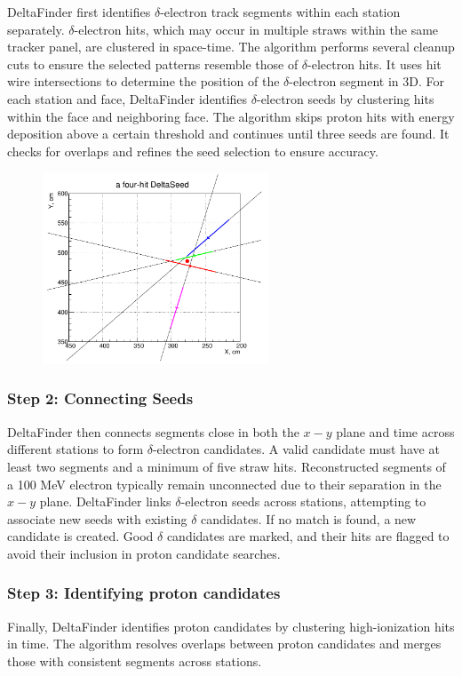 DeltaFinder first identifies $\delta$-electron track segments within 
each station separately. $\delta$-electron hits, which may occur in multiple 
straws within the same tracker panel, are clustered in space-time. The algorithm 
performs several cleanup cuts to ensure the selected patterns resemble 
those of $\delta$-electron hits. It uses hit wire intersections to determine the position 
of the $\delta$-electron segment in 3D.
For each station and face, DeltaFinder identifies $\delta$-electron seeds by 
clustering hits within the face and neighboring face. The algorithm skips proton 
hits with energy deposition above a certain threshold and continues until three 
seeds are found. It checks for overlaps and refines the seed selection to ensure accuracy.
\begin{figure}[!h]
    \centering
    \includegraphics[width =0.6\textwidth]{figures/png/Screenshot_20240811_115854.png}
    \caption[]{    }
    \label{fig:deltaseeds}
\end{figure}
\subsubsection{Step 2: Connecting Seeds}
DeltaFinder then connects segments close in both the $x-y$ plane and 
time across different stations to form $\delta$-electron candidates. 
A valid candidate must have at least two segments and a minimum of five straw hits. 
Reconstructed segments of a 100 MeV electron typically remain unconnected 
due to their separation in the $x-y$ plane.
DeltaFinder links $\delta$-electron seeds across stations, attempting to 
associate new seeds with existing $\delta$ candidates. If no match is found, a new candidate is created.
Good $\delta$ candidates are marked, and their hits are flagged 
to avoid their inclusion in proton candidate searches.


\subsubsection{Step 3: Identifying proton candidates}
Finally, DeltaFinder identifies proton candidates by clustering high-ionization 
hits in time. The algorithm resolves overlaps between proton candidates and 
merges those with consistent segments across stations.
